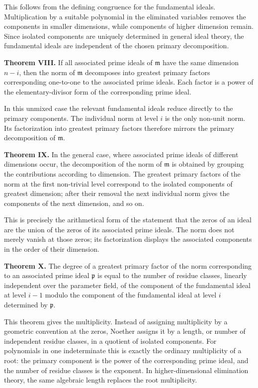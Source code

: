 \documentclass[12pt]{article}
\begin{document}
This follows from the defining congruence for the fundamental ideals. Multiplication by a suitable polynomial in the eliminated variables removes the components in smaller dimensions, while components of higher dimension remain. Since isolated components are uniquely determined in general ideal theory, the fundamental ideals are independent of the chosen primary decomposition.

\textbf{Theorem VIII.} If all associated prime ideals of $\mathfrak m$ have the same dimension $n-i$, then the norm of $\mathfrak m$ decomposes into greatest primary factors corresponding one-to-one to the associated prime ideals. Each factor is a power of the elementary-divisor form of the corresponding prime ideal.

In this unmixed case the relevant fundamental ideals reduce directly to the primary components. The individual norm at level $i$ is the only non-unit norm. Its factorization into greatest primary factors therefore mirrors the primary decomposition of $\mathfrak m$.

\textbf{Theorem IX.} In the general case, where associated prime ideals of different dimensions occur, the decomposition of the norm of $\mathfrak m$ is obtained by grouping the contributions according to dimension. The greatest primary factors of the norm at the first non-trivial level correspond to the isolated components of greatest dimension; after their removal the next individual norm gives the components of the next dimension, and so on.

This is precisely the arithmetical form of the statement that the zeros of an ideal are the union of the zeros of its associated prime ideals. The norm does not merely vanish at those zeros; its factorization displays the associated components in the order of their dimension.

\textbf{Theorem X.} The degree of a greatest primary factor of the norm corresponding to an associated prime ideal $\mathfrak p$ is equal to the number of residue classes, linearly independent over the parameter field, of the component of the fundamental ideal at level $i-1$ modulo the component of the fundamental ideal at level $i$ determined by $\mathfrak p$.

This theorem gives the multiplicity. Instead of assigning multiplicity by a geometric convention at the zeros, Noether assigns it by a length, or number of independent residue classes, in a quotient of isolated components. For polynomials in one indeterminate this is exactly the ordinary multiplicity of a root: the primary component is the power of the corresponding prime ideal, and the number of residue classes is the exponent. In higher-dimensional elimination theory, the same algebraic length replaces the root multiplicity.
\end{document}
